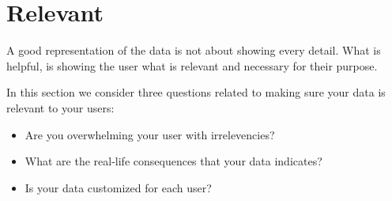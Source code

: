 \section{Relevant}

A good representation of the data is not about showing every detail. What is helpful, is showing the user what is relevant and necessary for their purpose.

In this section we consider three questions related to making sure your data is relevant to your users:

\begin{itemize}
    \item Are you overwhelming your user with irrelevencies?
    \item What are the real-life consequences that your data indicates?
    \item Is your data customized for each user?
\end{itemize}



